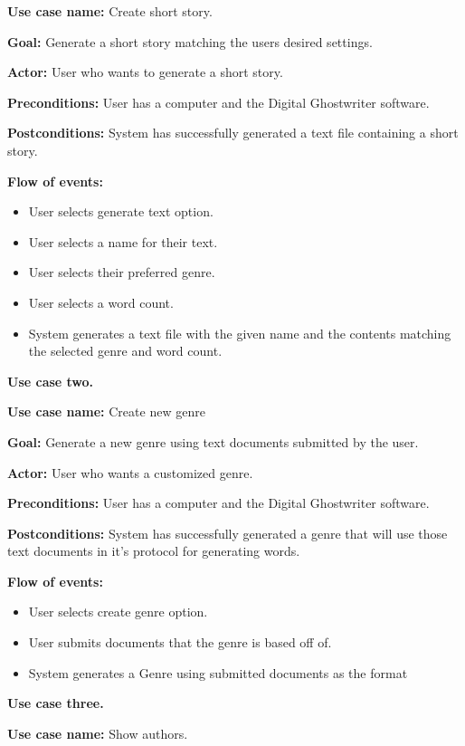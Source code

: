 \documentclass[12pt]{article}
\begin{document}
\textbf{Use case name:} Create short story.

\textbf{Goal:} Generate a short story matching the users desired settings. 

\textbf{Actor:} User who wants to generate a short story.

\textbf{Preconditions:} User has a computer and the Digital Ghostwriter software.

\textbf{Postconditions:} System has successfully generated a text file containing a short story.

\textbf{Flow of events:}
\begin{itemize}
\item User selects generate text option.
\item User selects a name for their text.
\item User selects their preferred genre. 
\item User selects a word count.
\item System generates a text file with the given name and the contents matching the selected genre and word count.
\end{itemize}

{\Large\textbf{Use case two.}\par}

\textbf{Use case name:} Create new genre

\textbf{Goal:} Generate a new genre using text documents submitted by the user. 

\textbf{Actor:} User who wants a customized genre.

\textbf{Preconditions:} User has a computer and the Digital Ghostwriter software.

\textbf{Postconditions:} System has successfully generated a genre that will use those text documents in it's protocol for generating words.

\textbf{Flow of events:}


\begin{itemize}
\item User selects create genre option.
\item User submits documents that the genre is based off of.
\item System generates a Genre using submitted documents as the format
\end{itemize}

{\Large\textbf{Use case three.}\par}

\textbf{Use case name:} Show authors.
\end{document}
